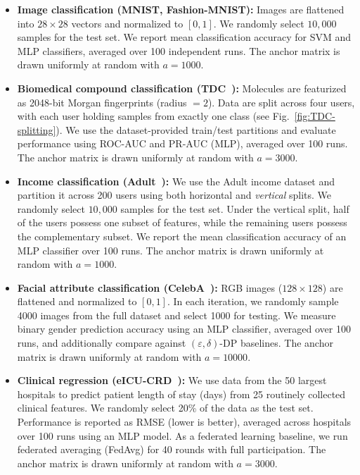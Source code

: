 \documentclass[final,3p,times]{elsarticle}
\theoremstyle{plain}
\begin{document}
\begin{itemize}[leftmargin=*,itemsep=3pt]

    \item \textbf{Image classification (MNIST, Fashion-MNIST):}
    Images are flattened into $28\times 28$ vectors and normalized to $[0,1]$. We randomly select $10{,}000$ samples for the test set. We report mean classification accuracy for SVM and MLP classifiers, averaged over 100 independent runs. The anchor matrix is drawn uniformly at random with $a=1000$.

    \item \textbf{Biomedical compound classification (TDC~\cite{TDC}):}
    Molecules are featurized as 2048-bit Morgan fingerprints (radius $=2$). Data are split across four users, with each user holding samples from exactly one class (see Fig.~\ref{fig:TDC-splitting}). We use the dataset-provided train/test partitions and evaluate performance using ROC-AUC and PR-AUC (MLP), averaged over 100 runs. The anchor matrix is drawn uniformly at random with $a=3000$.

    \item \textbf{Income classification (Adult~\cite{adult}):}
    We use the Adult income dataset and partition it across 200 users using both horizontal and \emph{vertical} splits. We randomly select $10{,}000$ samples for the test set. Under the vertical split, half of the users possess one subset of features, while the remaining users possess the complementary subset. We report the mean classification accuracy of an MLP classifier over 100 runs. The anchor matrix is drawn uniformly at random with $a=1000$.

    \item \textbf{Facial attribute classification (CelebA~\cite{celeba}):}
    RGB images ($128\times 128$) are flattened and normalized to $[0,1]$. In each iteration, we randomly sample 4000 images from the full dataset and select 1000 for testing. We measure binary gender prediction accuracy using an MLP classifier, averaged over 100 runs, and additionally compare against $(\varepsilon,\delta)$-DP baselines. The anchor matrix is drawn uniformly at random with $a=10000$.

    \item \textbf{Clinical regression (eICU-CRD~\cite{eicu}):}
    We use data from the 50 largest hospitals to predict patient length of stay (days) from 25 routinely collected clinical features. We randomly select 20\% of the data as the test set. Performance is reported as RMSE (lower is better), averaged across hospitals over 100 runs using an MLP model. As a federated learning baseline, we run federated averaging (FedAvg) for 40 rounds with full participation. The anchor matrix is drawn uniformly at random with $a=3000$.

\end{itemize}
\end{document}
